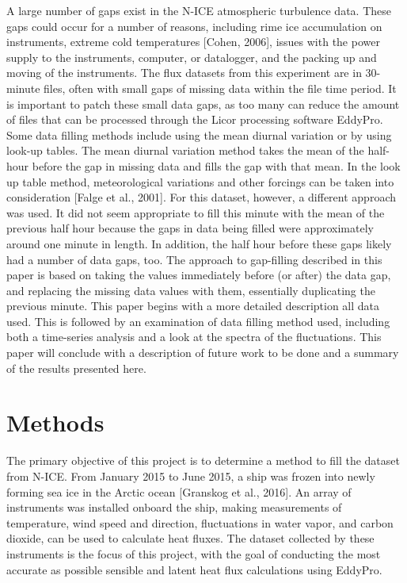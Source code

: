 A large number of gaps exist in the N-ICE atmospheric turbulence data. These gaps could occur for a number of reasons, including rime ice accumulation on instruments, extreme cold temperatures [Cohen, 2006], issues with the power supply to the instruments, computer, or datalogger, and the packing up and moving of the instruments. The flux datasets from this experiment are in 30-minute files, often with small gaps of missing data within the file time period. It is important to patch these small data gaps, as too many can reduce the amount of files that can be processed through the Licor processing software EddyPro. 
Some data filling methods include using the mean diurnal variation or by using look-up tables. The mean diurnal variation method takes the mean of the half-hour before the gap in missing data and fills the gap with that mean. In the look up table method, meteorological variations and other forcings can be taken into consideration [Falge et al., 2001]. For this dataset, however, a different approach was used. It did not seem appropriate to fill this minute with the mean of the previous half hour because the gaps in data being filled were approximately around one minute in length. In addition, the half hour before these gaps likely had a number of data gaps, too. The approach to gap-filling described in this paper is based on taking the values immediately before (or after) the data gap, and replacing the missing data values with them, essentially duplicating the previous minute.
This paper begins with a more detailed description all data used. This is followed by an examination of data filling method used, including both a time-series analysis and a look at the spectra of the fluctuations. This paper will conclude with a description of future work to be done and a summary of the results presented here. 

\section{Methods}
The primary objective of this project is to determine a method to fill the dataset from N-ICE. From January 2015 to June 2015, a ship was frozen into newly forming sea ice in the Arctic ocean [Granskog et al., 2016]. An array of instruments was installed onboard the ship, making measurements of temperature, wind speed and direction, fluctuations in water vapor, and carbon dioxide, can be used to calculate heat fluxes. The dataset collected by these instruments is the focus of this project, with the goal of conducting the most accurate as possible sensible and latent heat flux calculations using EddyPro. 

